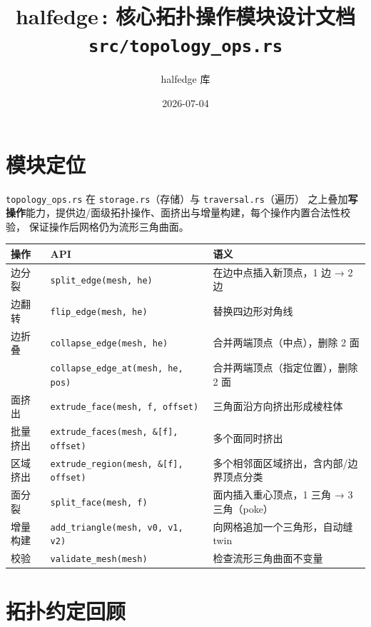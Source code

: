 \documentclass[11pt,a4paper]{article}
\title{\textbf{halfedge\,: 核心拓扑操作模块设计文档} \\ \large \texttt{src/topology\_ops.rs}}
\author{halfedge 库}
\date{2026-07-04}
\begin{document}
\maketitle
\tableofcontents

\section{模块定位}

\texttt{topology\_ops.rs} 在 \texttt{storage.rs}（存储）与 \texttt{traversal.rs}（遍历）
之上叠加\textbf{写操作}能力，提供边/面级拓扑操作、面挤出与增量构建，每个操作内置合法性校验，
保证操作后网格仍为流形三角曲面。

\begin{center}
\renewcommand{\arraystretch}{1.18}
\begin{tabular}{@{}lll@{}}
  \toprule
  \textbf{操作} & \textbf{API} & \textbf{语义} \\
  \midrule
  边分裂 & \texttt{split\_edge(mesh, he)} & 在边中点插入新顶点，1 边 → 2 边 \\
  边翻转 & \texttt{flip\_edge(mesh, he)}   & 替换四边形对角线 \\
  边折叠 & \texttt{collapse\_edge(mesh, he)} & 合并两端顶点（中点），删除 2 面 \\
        & \texttt{collapse\_edge\_at(mesh, he, pos)} & 合并两端顶点（指定位置），删除 2 面 \\
  面挤出 & \texttt{extrude\_face(mesh, f, offset)} & 三角面沿方向挤出形成棱柱体 \\
  批量挤出 & \texttt{extrude\_faces(mesh, \&[f], offset)} & 多个面同时挤出 \\
  区域挤出 & \texttt{extrude\_region(mesh, \&[f], offset)} & 多个相邻面区域挤出，含内部/边界顶点分类 \\
  面分裂 & \texttt{split\_face(mesh, f)} & 面内插入重心顶点，1 三角 → 3 三角（poke） \\
  增量构建 & \texttt{add\_triangle(mesh, v0, v1, v2)} & 向网格追加一个三角形，自动缝 twin \\
  \midrule
  校验   & \texttt{validate\_mesh(mesh)} & 检查流形三角曲面不变量 \\
  \bottomrule
\end{tabular}
\end{center}

\section{拓扑约定回顾}
\end{document}
